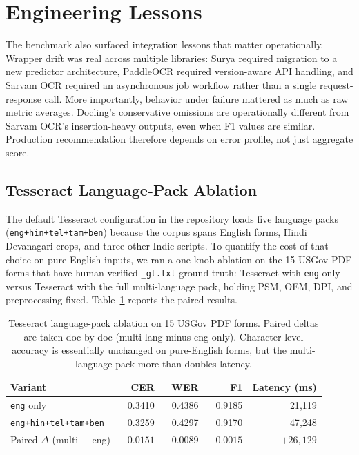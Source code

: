 \documentclass[conference]{IEEEtran}
\begin{document}
\section{Engineering Lessons}

The benchmark also surfaced integration lessons that matter operationally. Wrapper drift was real across multiple libraries: Surya required migration to a new predictor architecture, PaddleOCR required version-aware API handling, and Sarvam OCR required an asynchronous job workflow rather than a single request-response call. More importantly, behavior under failure mattered as much as raw metric averages. Docling's conservative omissions are operationally different from Sarvam OCR's insertion-heavy outputs, even when F1 values are similar. Production recommendation therefore depends on error profile, not just aggregate score.

\subsection{Tesseract Language-Pack Ablation}

The default Tesseract configuration in the repository loads five language packs (\texttt{eng+hin+tel+tam+ben}) because the corpus spans English forms, Hindi Devanagari crops, and three other Indic scripts. To quantify the cost of that choice on pure-English inputs, we ran a one-knob ablation on the 15 USGov PDF forms that have human-verified \texttt{\_gt.txt} ground truth: Tesseract with \texttt{eng} only versus Tesseract with the full multi-language pack, holding PSM, OEM, DPI, and preprocessing fixed. Table~\ref{tab:tesseract-lang} reports the paired results.

\begin{table}[t]
\centering
\caption{Tesseract language-pack ablation on 15 USGov PDF forms. Paired deltas are taken doc-by-doc (multi-lang minus eng-only). Character-level accuracy is essentially unchanged on pure-English forms, but the multi-language pack more than doubles latency.}
\label{tab:tesseract-lang}
\footnotesize
\begin{tabular}{lrrrr}
\toprule
\textbf{Variant} & \textbf{CER} & \textbf{WER} & \textbf{F1} & \textbf{Latency (ms)} \\
\midrule
\texttt{eng} only                & 0.3410 & 0.4386 & 0.9185 & 21{,}119 \\
\texttt{eng+hin+tel+tam+ben}     & 0.3259 & 0.4297 & 0.9170 & 47{,}248 \\
\midrule
Paired $\Delta$ (multi $-$ eng) & $-0.0151$ & $-0.0089$ & $-0.0015$ & $+26{,}129$ \\
\bottomrule
\end{tabular}
\end{table}
\end{document}
